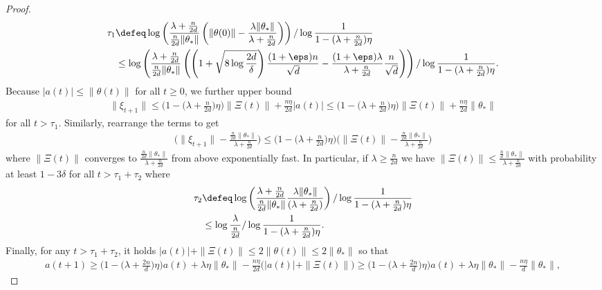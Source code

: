 \begin{proof}
    \begin{align*}
        \tau_1 & \defeq \log\left(\frac{\lambda+\frac{n}{2d}}{\frac{n}{2d}\|\theta_*\|} \left(\|\theta(0)\| - \frac{\lambda\|\theta_*\|}{\lambda + \frac{n}{2d}}\right)\right)/\log\frac{1}{1 - (\lambda+\frac{n}{2d})\eta} \\
        & \leq \log\left(\frac{\lambda+\frac{n}{2d}}{\frac{n}{2d}\|\theta_*\|} \left(\left(1 + \sqrt{8\log\frac{2d}{\delta}}\right)\frac{(1+\eps)n}{\sqrt{d}} - \frac{(1+\eps)\lambda}{\lambda + \frac{n}{2d}}\frac{n}{\sqrt{d}}\right)\right)/\log\frac{1}{1 - (\lambda+\frac{n}{2d})\eta}.
    \end{align*}
    Because $|a(t)|\leq \|\theta(t)\|$ for all $t\geq 0$, we further upper bound 
    \begin{align*}
        \|\xi_{t+1}\| \leq \Big(1-\Big(\lambda + \frac{n}{2d}\Big)\eta \Big)\|\Xi(t)\| + \frac{n\eta}{2d}|a(t)| \leq \Big(1-\Big(\lambda + \frac{n}{2d}\Big)\eta \Big)\|\Xi(t)\| + \frac{n\eta}{2d}\|\theta_*\|
    \end{align*}
    for all $t>\tau_1$. 
    Similarly, rearrange the terms to get
    \begin{align*}
        \Big(\|\xi_{t+1}\| - \frac{\frac{n}{2d}\|\theta_*\|}{\lambda + \frac{n}{2d}}\Big) \leq \Big(1-\Big(\lambda + \frac{n}{2d}\Big)\eta \Big) \Big(\|\Xi(t)\| - \frac{\frac{n}{2d}\|\theta_*\|}{\lambda + \frac{n}{2d}}\Big)
    \end{align*}
    where $\|\Xi(t)\|$ converges to $\frac{\frac{n}{2d}\|\theta_*\|}{\lambda + \frac{n}{2d}}$ from above exponentially fast. 
    In particular, if $\lambda\geq \frac{n}{2d}$ we have $\|\Xi(t)\| \leq \frac{\frac{n}{d}\|\theta_*\|}{\lambda + \frac{n}{2d}}$ with probability at least $1-3\delta$ for all $t>\tau_1+\tau_2$ where 
    \begin{align*}
        \tau_2 & \defeq \log \left( \frac{\lambda+\frac{n}{2d}}{\frac{n}{2d}\|\theta_*\|} \frac{\lambda\|\theta_*\|}{(\lambda + \frac{n}{2d})} \right)/\log\frac{1}{1 - (\lambda+\frac{n}{2d})\eta} \\
        & \leq \log\frac{\lambda}{\frac{n}{2d}}/\log\frac{1}{1 - (\lambda+\frac{n}{2d})\eta}.
    \end{align*}
    Finally, for any $t>\tau_1+\tau_2$, it holds $|a(t)|+\|\Xi(t)\|\leq 2\|\theta(t)\|\leq 2\|\theta_*\|$ so that 
    \begin{align*}
        a(t+1)\geq \Big(1-\Big(\lambda + \frac{2n}{d}\Big)\eta \Big)a(t)+\lambda\eta\|\theta_*\| - \frac{n\eta}{2d} \big(|a(t)| + \|\Xi(t)\|\big)
        \geq  \Big(1-\Big(\lambda + \frac{2n}{d}\Big)\eta \Big)a(t)+\lambda\eta\|\theta_*\| - \frac{n\eta}{d}\|\theta_*\|,

\end{align*}
\end{proof}
